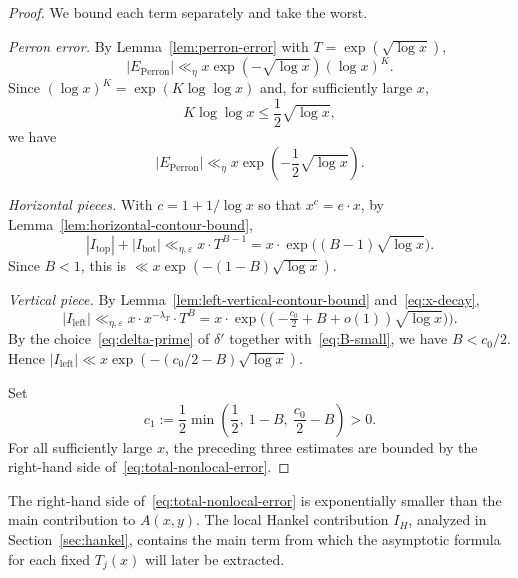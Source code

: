 \begin{proof}
We bound each term separately and take the worst.

\emph{Perron error.}
By Lemma~\ref{lem:perron-error} with $T = \exp(\sqrt{\log x})$,
\[
    |E_{\mathrm{Perron}}|
    \ll_\eta
    x\exp(-\sqrt{\log x})(\log x)^K.
\]
Since $(\log x)^K=\exp(K\log\log x)$ and, for sufficiently large
$x$,
\[
    K\log\log x\leq\frac12\sqrt{\log x},
\]
we have
\[
    |E_{\mathrm{Perron}}|
    \ll_\eta x\exp\left(-\frac12\sqrt{\log x}\right).
\]

\emph{Horizontal pieces.}
With $c = 1 + 1/\log x$ so that $x^c = e \cdot x$, by
Lemma~\ref{lem:horizontal-contour-bound},
\[
    |I_{\mathrm{top}}| + |I_{\mathrm{bot}}|
    \ll_{\eta, \varepsilon}
    x \cdot T^{B - 1}
    = x \cdot \exp\bigl((B - 1) \sqrt{\log x}\bigr).
\]
Since $B < 1$, this is $\ll x \exp(- (1 - B) \sqrt{\log x})$.

\emph{Vertical piece.}
By Lemma~\ref{lem:left-vertical-contour-bound} and~\eqref{eq:x-decay},
\[
    |I_{\mathrm{left}}|
    \ll_{\eta, \varepsilon}
    x \cdot x^{- \lambda_T} \cdot T^B
    = x \cdot \exp\bigl((- \tfrac{c_0}{2}+B+o(1))\sqrt{\log x})\bigr).
\]
By the choice~\eqref{eq:delta-prime} of $\delta'$ together
with~\eqref{eq:B-small}, we have $B < c_0/2$. Hence
$|I_{\mathrm{left}}| \ll x \exp(- (c_0/2 - B) \sqrt{\log x})$.

Set
\[
    c_1:=\frac12\min\left(\frac12,\ 1-B,\ \frac{c_0}{2}-B\right)>0.
\]
For all sufficiently large $x$, the preceding three estimates are
bounded by the right-hand side of~\eqref{eq:total-nonlocal-error}.
\end{proof}

The right-hand side of~\eqref{eq:total-nonlocal-error} is
exponentially smaller than the main contribution to
$A(x,y)$. The local Hankel contribution $I_H$, analyzed in
Section~\ref{sec:hankel}, contains the main term from which the
asymptotic formula for each fixed $T_j(x)$ will later be extracted.

